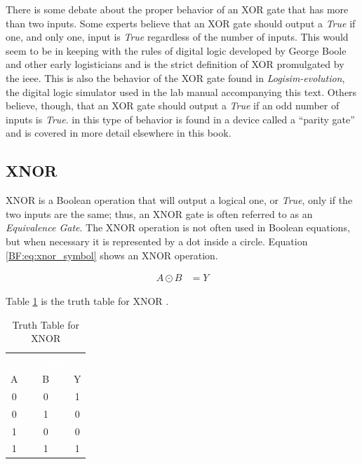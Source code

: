 There is some debate about the proper behavior of an \textsf{XOR}  gate that has more than two inputs. Some experts believe that an \textsf{XOR} gate should output a \emph{True} if one, and only one, input is \emph{True} regardless of the number of inputs. This would seem to be in keeping with the rules of digital logic developed by George Boole and other early logisticians and is the strict definition of \textsf{XOR} promulgated by the \gls{ieee}. This is also the behavior of the \textsf{XOR} gate found in \textit{Logisim-evolution}, the digital logic simulator used in the lab manual accompanying this text. Others believe, though, that an \textsf{XOR} gate should output a \emph{True} if an odd number of inputs is \emph{True}. in \Le this type of behavior is found in a device called a ``parity gate'' and is covered in more detail elsewhere in this book.

\subsection{XNOR}
\label{BF:subsec:xnor}

\textsf{XNOR} is a Boolean operation that will output a logical one, or \emph{True}, only if the two inputs are the same; thus, an \textsf{XNOR} gate is often referred to as an \emph{Equivalence Gate}. The \textsf{XNOR} operation is not often used in Boolean equations, but when necessary it is represented by a dot inside a circle. Equation \ref{BF:eq:xnor_symbol} shows an \textsf{XNOR}  operation. 

\begin{align}
  \label{BF:eq:xnor_symbol}
  A \odot B &= Y
\end{align}

Table \ref{BF:tab:truth_table_for_xnor} is the truth table for \textsf{XNOR} . 

\begin{table}[H]
  \sffamily
  \newcommand{\head}[1]{\textcolor{white}{\textbf{#1}}}    
  \begin{center}
    \begin{tabular}{ccc} 
      \rowcolor{black!75}
      \multicolumn{2}{c}{\head{Inputs}} & \head{Output} \\
      A & B & Y \\
      \hline
      0 & 0 & 1 \\
      0 & 1 & 0 \\
      1 & 0 & 0 \\
      1 & 1 & 1 
    \end{tabular}
  \end{center}
  \caption{Truth Table for XNOR}
  \label{BF:tab:truth_table_for_xnor}
\end{table}

